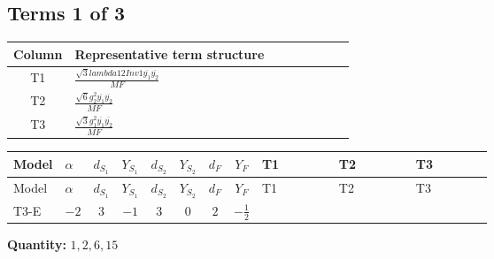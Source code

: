 \documentclass[8pt]{article}
\begin{document}
\begin{landscape}
\subsection*{Terms 1 of 3}
\begin{center}
\begin{tabular}{@{}c >{\raggedright\arraybackslash}p{0.82\linewidth}@{}}
\toprule
Column & Representative term structure \\
\midrule
T1 & \(\displaystyle \frac{\sqrt{3} lambda12Inv1 \overline{y_{1}} \overline{y_{2}}}{MF}\) \\
\midrule
T2 & \(\displaystyle \frac{\sqrt{6} g_{2}^{2} \overline{y_{1}} \overline{y_{2}}}{MF}\) \\
\midrule
T3 & \(\displaystyle \frac{\sqrt{3} g_{1}^{2} \overline{y_{1}} \overline{y_{2}}}{MF}\) \\
\midrule
\bottomrule
\end{tabular}
\end{center}
\smallskip
\tiny
\begin{longtable}{@{}llcccccc >{\raggedright\arraybackslash}p{0.21\linewidth} >{\raggedright\arraybackslash}p{0.21\linewidth} >{\raggedright\arraybackslash}p{0.21\linewidth}@{}}
\toprule
Model & $\alpha$ & $d_{S_1}$ & $Y_{S_1}$ & $d_{S_2}$ & $Y_{S_2}$ & $d_F$ & $Y_F$ & T1 & T2 & T3 \\
\midrule
\endfirsthead
\toprule
Model & $\alpha$ & $d_{S_1}$ & $Y_{S_1}$ & $d_{S_2}$ & $Y_{S_2}$ & $d_F$ & $Y_F$ & T1 & T2 & T3 \\
\midrule
\endhead
T3-E & $-2$ & $3$ & $-1$ & $3$ & $0$ & $2$ & $-\frac{1}{2}$ & \scriptsize\adjustbox{max width=\linewidth}{$\begin{gathered} - \frac{\sqrt{3} lambda12Inv1 \overline{y_{1}} \overline{y_{2}}}{6 MF}\end{gathered}$} & \scriptsize\adjustbox{max width=\linewidth}{$\begin{gathered} \frac{\sqrt{6} g_{2}^{2} \overline{y_{1}} \overline{y_{2}}}{6 MF}\end{gathered}$} & \scriptsize\adjustbox{max width=\linewidth}{$\begin{gathered} \frac{\sqrt{3} g_{1}^{2} \overline{y_{1}} \overline{y_{2}}}{8 MF}\end{gathered}$} \\
\midrule
\bottomrule
\end{longtable}
\clearpage
\noindent\textbf{Quantity: }$\mathrm{1,2,6,15}$\par\smallskip

\end{landscape}
\end{document}

